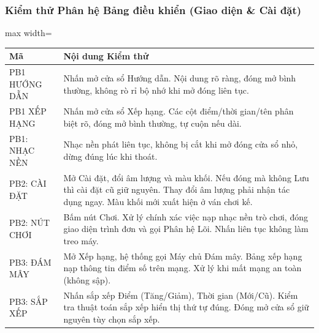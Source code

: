 \documentclass[12pt,a4paper]{article}
\begin{document}
\subsubsection{Kiểm thử Phân hệ Bảng điều khiển (Giao diện \& Cài đặt)}
\begin{center}
\begin{adjustbox}{max width=\linewidth}
\begin{tabular}{|p{2.2cm}|p{10.8cm}|}
\hline
\rowcolor{gray!35}
\textbf{Mã} & \textbf{Nội dung Kiểm thử} \\ \hline
PB1 HƯỚNG DẪN & Nhấn mở cửa sổ Hướng dẫn. Nội dung rõ ràng, đóng mở bình thường, không rò rỉ bộ nhớ khi mở đóng liên tục. \\ \hline
PB1 XẾP HẠNG & Nhấn mở cửa sổ Xếp hạng. Các cột điểm/thời gian/tên phân biệt rõ, đóng mở bình thường, tự cuộn nếu dài. \\ \hline
PB1: NHẠC NỀN & Nhạc nền phát liên tục, không bị cắt khi mở đóng cửa sổ nhỏ, dừng đúng lúc khi thoát. \\ \hline
PB2: CÀI ĐẶT & Mở Cài đặt, đổi âm lượng và màu khối. Nếu đóng mà không Lưu thì cài đặt cũ giữ nguyên. Thay đổi âm lượng phải nhận tác dụng ngay. Màu khối mới xuất hiện ở ván chơi kế. \\ \hline
PB2: NÚT CHƠI & Bấm nút Chơi. Xử lý chính xác việc nạp nhạc nền trò chơi, đóng giao diện trình đơn và gọi Phân hệ Lõi. Nhấn liên tục không làm treo máy. \\ \hline
PB3: ĐÁM MÂY & Mở Xếp hạng, hệ thống gọi Máy chủ Đám mây. Bảng xếp hạng nạp thông tin điểm số trên mạng. Xử lý khi mất mạng an toàn (không sập). \\ \hline
PB3: SẮP XẾP & Nhấn sắp xếp Điểm (Tăng/Giảm), Thời gian (Mới/Cũ). Kiểm tra thuật toán sắp xếp hiển thị thứ tự đúng. Đóng mở cửa sổ giữ nguyên tùy chọn sắp xếp. \\ \hline
\end{tabular}
\end{adjustbox}
\end{center}
\end{document}
